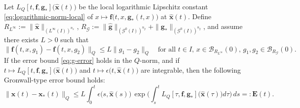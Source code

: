 \documentclass[10pt,a4paper]{amsart}
\newcommand {\cB} {\mathcal{B}}
\newcommand {\cG} {\mathcal{G}}
\newcommand{\BE}{\ensuremath{\mathbf{E}} } %
\newcommand{\bff}{\ensuremath{\mathbf{f}}} %
\newcommand{\bg}{\ensuremath{\mathbf{g}}} %
\newcommand{\bx}{\ensuremath{\mathbf{x}}} %
\begin{document}
\begin{theorem}   \label{thm:error-estimate-comparison-lemma}
     Let   $L_Q[t,\bff,\bg_*]\big(  \widehat{\bx}(t) \big)$ be the local logarithmic Lipschitz constant  \cref{eq:logarithmic-norm-local}
     of $x \mapsto \bff\big(t, x, \bg_*(t, x)\big)$ at $\widehat{\bx}(t)$. Define
     $R_{L^\infty} := \| \widehat{\bx} \|_{(L^\infty(I))^{n_x}}$,
     $R_{\cG} := \| \widehat{\bg} \|_{(\cG^0(I))^{n_g}} + \| \bg_* \|_{(\cG^0(I))^{n_g}}$,
     and assume there exists $L > 0$ such that
     \begin{equation} \label{eq:uniformly-lipschitz}
     	\| \bff(t, x, g_1) -  \bff(t, x, g_2) \|_Q \le L \| g_1 - g_2 \|_Q \quad \textrm{for all $t \in I$, $x \in \cB_{R_{L^\infty}}(0)$, $g_1, g_2 \in \cB_{R_{\cG}}(0)$.}
     \end{equation}
     If the error bound \cref{eq:g-error} holds in the $Q$-norm, and if $t \mapsto L_Q[t,\bff,\bg_*]\big(  \widehat{\bx}(t) \big)$
     and $t \mapsto \epsilon\big(t, \widehat{\bx}(t) \big)$ are integrable,  then the following Gronwall-type error bound holds:
     \begin{equation}   \label{eq:error-estimate-comparison-lemma}
          \big\| \widehat{\bx}(t) - \bx_*(t) \big\|_Q
          \le L   \int_0^t    \epsilon\big(s, \widehat{\bx}(s) \big)   \, 
                             \exp\big( \int_s^t  L_Q[\tau, \bff,\bg_*]\big(  \widehat{\bx}(\tau) \big)  d\tau \big) \, ds =: \BE(t).
     \end{equation}
\end{theorem}
\end{document}
